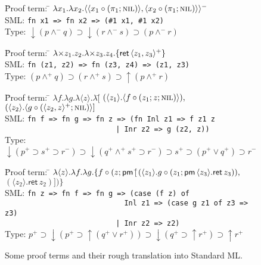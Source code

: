 \documentclass[acmtocl]{robtrans}\pdfoutput=1
\newcommand{\susp}[1]{\langle{#1}\rangle}
\newcommand{\etart}[1]{\langle{#1}\rangle} \newcommand{\etalt}[2]{\susp{#1}.{#2}}
\newcommand{\rft}[1]{\mathsf{ret}\,{#1}} \newcommand{\lft}[2]{{#1} \circ {#2}}
\begin{document}
\begin{figure}
\begin{tabbing}
\qquad \=
Proof term: \= $\lambda x_1.\lambda x_2.
  \langle \etart{\lft{x_1}{(\pi_1; \textsc{nil})}}, 
          \etart{\lft{x_2}{(\pi_1; \textsc{nil})}}\rangle^-$
\\
\>SML: \> \verb'fn x1 => fn x2 => (#1 x1, #1 x2)'
\\
\>Type: \> ${\downarrow}(p \wedge^- q) \supset
 {\downarrow}(r \wedge^- s) \supset 
 (p \wedge^- r)$
\\
\end{tabbing}

\begin{tabbing}
\qquad \=
Proof term: \= $\lambda {\times} z_1.z_2. 
\lambda {\times} z_3.z_4.
 \usrt{\rft{\langle z_1, z_3 \rangle^+}}$
\\
\>SML: \> \verb'fn (z1, z2) => fn (z3, z4) => (z1, z3)'
\\
\>Type: \> $(p \wedge^+ q) \supset 
 (r \wedge^+ s) \supset
 {\uparrow}(p \wedge^+ r)$
\\
\end{tabbing}

\begin{tabbing}
\qquad \=
Proof term: \= $\lambda f. \lambda g. 
    \lambda \etalt{z}{} \lambda[$\=
      $(\etalt{z_1}{\etart{\lft{f}{(z_1; z; \textsc{nil})}}}),$\\
\>\>\>$(\etalt{z_2}{\etart{\lft{g}{(\langle z_2, z\rangle^+; \textsc{nil})}}}]$
\\
\>SML: \> \verb'fn f => fn g => fn z => (fn Inl z1 => f z1 z'
\\   \>\> \verb'                          | Inr z2 => g (z2, z))'
\\
\>Type: \> ${\downarrow}(p^+ \supset s^+ \supset r^-) \supset
 {\downarrow}(q^+ \wedge^+ s^+ \supset r^-) \supset
 s^+ \supset (p^+ \vee q^+) \supset r^-$
\\
\end{tabbing}

\begin{tabbing}
\qquad \=
Proof term: \= $\lambda \etalt{z}{} \lambda f. \lambda g. 
 \{\lft{f}{(z; \uslt{[}}$\=$(
  \etalt{z_1}
        {\lft{g}{(z_1; \uslt{\etalt{z_3}{\rft{z_3}}})}}),$\\
\>\>\>$(\etalt{z_2}{\rft{z_2}})])\}$
\\
\>SML: \> \verb'fn z => fn f => fn g => (case (f z) of'
\\   \>\> \verb'                            Inl z1 => (case g z1 of z3 => z3)'
\\   \>\> \verb'                          | Inr z2 => z2)'
\\
\>Type: \> $p^+ \supset {\downarrow}(p^+ \supset {\uparrow}(q^+ \vee r^+)) \supset
 {\downarrow}(q^+ \supset {\uparrow}r^+) \supset {\uparrow}r^+$
\end{tabbing}
\caption{Some proof terms and their rough translation into Standard ML.}
\label{fig:sml-ex}
\end{figure}
\end{document}
